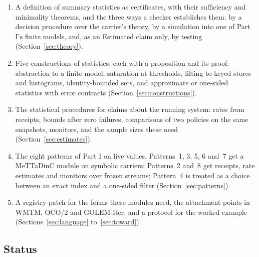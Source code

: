 \documentclass[11pt]{article}
\theoremstyle{definition}
\theoremstyle{plain}
\begin{document}
\begin{enumerate}
\item A definition of summary statistics as certificates, with their sufficiency and minimality
  theorems, and the three ways a checker establishes them: by a decision procedure over the
  carrier's theory, by a simulation into one of Part I's finite models, and, as an Estimated claim
  only, by testing (Section~\ref{sec:theory}).
\item Five constructions of statistics, each with a proposition and its proof: abstraction to a
  finite model, saturation at thresholds, lifting to keyed stores and histograms,
  identity-bounded sets, and approximate or one-sided statistics with error contracts
  (Section~\ref{sec:constructions}).
\item The statistical procedures for claims about the running system: rates from receipts,
  bounds after zero failures, comparisons of two policies on the same snapshots, monitors, and the
  sample sizes these need (Section~\ref{sec:estimates}).
\item The eight patterns of Part I on live values. Patterns~1, 3, 5, 6 and~7 get a MeTTaDinC module
  on symbolic carriers; Patterns~2 and~8 get receipts, rate estimates and monitors over frozen
  streams; Pattern~4 is treated as a choice between an exact index and a one-sided filter
  (Section~\ref{sec:patterns}).
\item A registry patch for the forms these modules need, the attachment points in WMTM, OCO/2 and
  GOLEM-Iter, and a protocol for the worked example (Sections~\ref{sec:language}
  to~\ref{sec:toward}).
\end{enumerate}

\subsection{Status}
\end{document}
